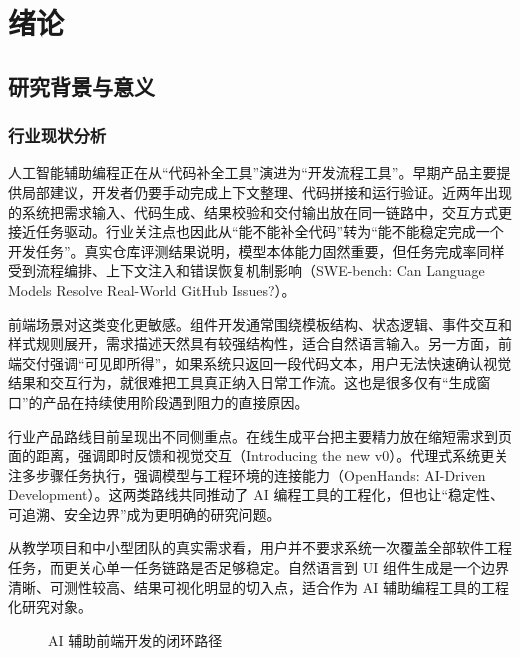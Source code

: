 ﻿\chapter{绪论}

\section{研究背景与意义}
\subsection{行业现状分析}
人工智能辅助编程正在从“代码补全工具”演进为“开发流程工具”。早期产品主要提供局部建议，开发者仍要手动完成上下文整理、代码拼接和运行验证。近两年出现的系统把需求输入、代码生成、结果校验和交付输出放在同一链路中，交互方式更接近任务驱动。行业关注点也因此从“能不能补全代码”转为“能不能稳定完成一个开发任务”。真实仓库评测结果说明，模型本体能力固然重要，但任务完成率同样受到流程编排、上下文注入和错误恢复机制影响（SWE-bench: Can Language Models Resolve Real-World GitHub Issues?）\cite{jimenez2024swebench}。

前端场景对这类变化更敏感。组件开发通常围绕模板结构、状态逻辑、事件交互和样式规则展开，需求描述天然具有较强结构性，适合自然语言输入。另一方面，前端交付强调“可见即所得”，如果系统只返回一段代码文本，用户无法快速确认视觉结果和交互行为，就很难把工具真正纳入日常工作流。这也是很多仅有“生成窗口”的产品在持续使用阶段遇到阻力的直接原因。

行业产品路线目前呈现出不同侧重点。在线生成平台把主要精力放在缩短需求到页面的距离，强调即时反馈和视觉交互（Introducing the new v0）\cite{vercel2026newv0}。代理式系统更关注多步骤任务执行，强调模型与工程环境的连接能力（OpenHands: AI-Driven Development）\cite{openhands2026github}。这两类路线共同推动了 AI 编程工具的工程化，但也让“稳定性、可追溯、安全边界”成为更明确的研究问题。

从教学项目和中小型团队的真实需求看，用户并不要求系统一次覆盖全部软件工程任务，而更关心单一任务链路是否足够稳定。自然语言到 UI 组件生成是一个边界清晰、可测性较高、结果可视化明显的切入点，适合作为 AI 辅助编程工具的工程化研究对象。

\begin{figure}[htbp]
\centering
{}
\caption{AI 辅助前端开发的闭环路径}
\label{fig:chapter1-closed-loop}
\end{figure}

